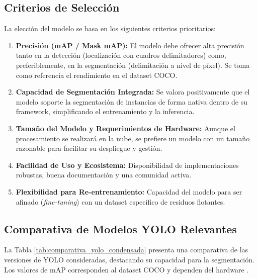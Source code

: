 \subsection{Criterios de Selección}
\label{subsec:criterios_vision}

La elección del modelo se basa en los siguientes criterios prioritarios:

\begin{enumerate}
    \item \textbf{Precisión (mAP / Mask mAP):} El modelo debe ofrecer alta precisión tanto en la detección (localización con cuadros delimitadores) como, preferiblemente, en la segmentación (delimitación a nivel de píxel). Se toma como referencia el rendimiento en el dataset COCO.
    \item \textbf{Capacidad de Segmentación Integrada:} Se valora positivamente que el modelo soporte la segmentación de instancias de forma nativa dentro de su framework, simplificando el entrenamiento y la inferencia.
    \item \textbf{Tamaño del Modelo y Requerimientos de Hardware:} Aunque el procesamiento se realizará en la nube, se prefiere un modelo con un tamaño razonable para facilitar su despliegue y gestión.
    \item \textbf{Facilidad de Uso y Ecosistema:} Disponibilidad de implementaciones robustas, buena documentación y una comunidad activa.
    \item \textbf{Flexibilidad para Re-entrenamiento:} Capacidad del modelo para ser afinado (\textit{fine-tuning}) con un dataset específico de residuos flotantes.
\end{enumerate}

\subsection{Comparativa de Modelos YOLO Relevantes}
\label{subsec:comparativa_yolo}

La Tabla \ref{tab:comparativa_yolo_condensada} presenta una comparativa de las versiones de YOLO consideradas, destacando su capacidad para la segmentación. Los valores de mAP corresponden al dataset COCO y dependen del hardware \cite{terven2023yolo, sapkota2025yolo}.

